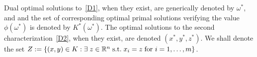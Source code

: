 
Dual optimal solutions to~\eqref{D1}, when they exist, are generically denoted by $\omega^*$, and and the set of corresponding optimal primal solutions verifying the value $\phi(\omega^*)$ is denoted by $K^*(\omega^*)$. The optimal solutions to the second characterization~\eqref{D2}, when they exist, are denoted $(x^*,y^*,z^*)$. We shall denote the set $Z:=\left\{ (x,y) \in K : \exists \; z \in \mathbb{R}^n \; \text{s.t.} \; x_i=z\; \text{for }i=1,\dots,m \right \}$. 

